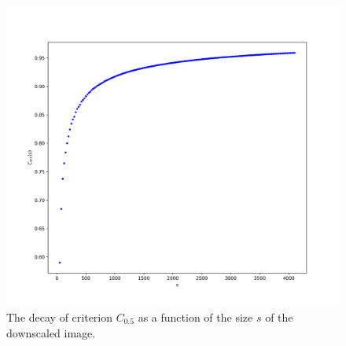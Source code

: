 \documentclass[reprint,amsmath,amssymb,aps,pre]{revtex4-1}
\begin{document}
\begin{figure}[ht]
  \centering
  \includegraphics[width=0.9\linewidth]{images/plot-criterion.png}
  \caption[]{The decay of criterion $C_{0.5}$ as a function of the size $s$ of
    the downscaled image.}
  \label{fig:crit-plot}
\end{figure}
\end{document}
